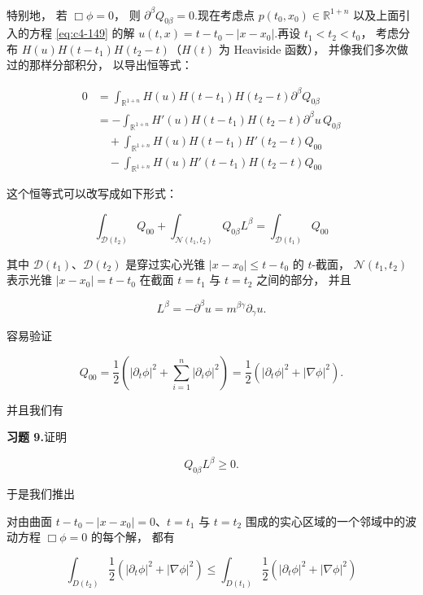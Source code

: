 特别地， 若 $\Box\phi = 0$， 则 $\partial^{\beta}Q_{0\beta} = 0$.现在考虑点 $p(t_{0}, x_{0}) \in \mathbb{R}^{1+n}$ 以及上面引入的方程 \eqref{eq:c4-149} 的解 $u(t, x) = t-t_{0}-|x-x_{0}|$.再设 $t_{1} < t_{2} < t_{0}$， 考虑分布 $H(u)H(t-t_{1})H(t_{2}-t)$（$H(t)$ 为 Heaviside 函数）， 并像我们多次做过的那样分部积分， 以导出恒等式：

\[
\begin{aligned}
0 &= \int_{\mathbb{R}^{1+n}}H(u)H(t-t_{1})H(t_{2}-t)\partial^{\beta}Q_{0\beta} \\
&= -\int_{\mathbb{R}^{1+n}}H'(u)H(t-t_{1})H(t_{2}-t)\partial^{\beta}u\, Q_{0\beta} \\
&\quad + \int_{\mathbb{R}^{1+n}}H(u)H(t-t_{1})H'(t_{2}-t)Q_{00} \\
&\quad - \int_{\mathbb{R}^{1+n}}H(u)H'(t-t_{1})H(t_{2}-t)Q_{00}
\end{aligned}
\]

这个恒等式可以改写成如下形式：

\begin{equation}
\int_{\mathcal{D}(t_{2})}Q_{00} + \int_{\mathcal{N}(t_{1}, t_{2})}Q_{0\beta}L^{\beta} = \int_{\mathcal{D}(t_{1})}Q_{00}\label{eq:c4-152}
\end{equation}

其中 $\mathcal{D}(t_{1})$、$\mathcal{D}(t_{2})$ 是穿过实心光锥 $|x-x_{0}| \leq t-t_{0}$ 的 $t$-截面， $\mathcal{N}(t_{1}, t_{2})$ 表示光锥 $|x-x_{0}| = t-t_{0}$ 在截面 $t = t_{1}$ 与 $t = t_{2}$ 之间的部分， 并且

\[
L^{\beta} = -\partial^{\beta}u = m^{\beta\gamma}\partial_{\gamma}u.
\]

容易验证

\[
Q_{00} = \frac{1}{2}\left(|\partial_{t}\phi|^{2} + \sum_{i=1}^{n}|\partial_{i}\phi|^{2}\right) = \frac{1}{2}\left(|\partial_{t}\phi|^{2} + |\nabla\phi|^{2}\right).
\]

并且我们有

\noindent\textbf{习题 9.}\quad 证明

\[
Q_{0\beta}L^{\beta} \geq 0.
\]

于是我们推出

\begin{theorem}[能量不等式]\label{thm:c4-3.4}
对由曲面 $t-t_{0}-|x-x_{0}| = 0$、$t = t_{1}$ 与 $t = t_{2}$ 围成的实心区域的一个邻域中的波动方程 $\Box\phi = 0$ 的每个解， 都有

\[
\int_{D(t_{2})}\frac{1}{2}\left(|\partial_{t}\phi|^{2} + |\nabla\phi|^{2}\right) \leq \int_{D(t_{1})}\frac{1}{2}\left(|\partial_{t}\phi|^{2} + |\nabla\phi|^{2}\right)
\]
\end{theorem}


